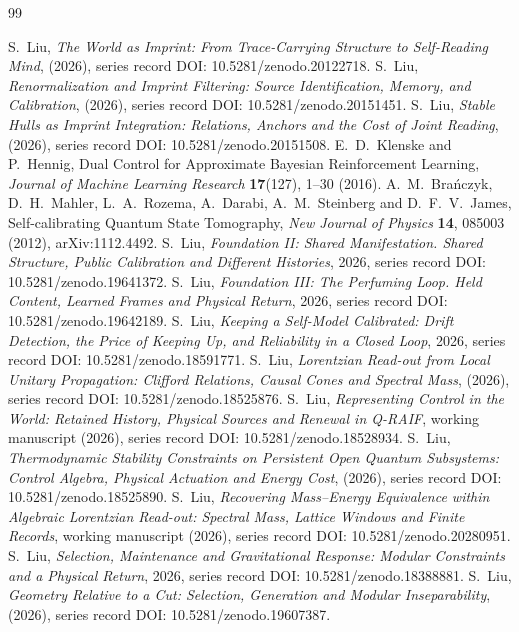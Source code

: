 \documentclass[11pt,a4paper]{article}
\begin{document}
\begin{thebibliography}{99}
\raggedright
{} S.~Liu, \emph{The World as Imprint: From Trace-Carrying Structure to Self-Reading Mind}, (2026), series record DOI: 10.5281/zenodo.20122718.
 S.~Liu, \emph{Renormalization and Imprint Filtering: Source Identification, Memory, and Calibration}, (2026), series record DOI: 10.5281/zenodo.20151451.
 S.~Liu, \emph{Stable Hulls as Imprint Integration: Relations, Anchors and the Cost of Joint Reading}, (2026), series record DOI: 10.5281/zenodo.20151508.
 E.~D.~Klenske and P.~Hennig, Dual Control for Approximate Bayesian Reinforcement Learning, \emph{Journal of Machine Learning Research} \textbf{17}(127), 1--30 (2016).
 A.~M.~Bra\'nczyk, D.~H.~Mahler, L.~A.~Rozema, A.~Darabi, A.~M.~Steinberg and D.~F.~V.~James, Self-calibrating Quantum State Tomography, \emph{New Journal of Physics} \textbf{14}, 085003 (2012), arXiv:1112.4492.
 S.~Liu, \emph{Foundation II: Shared Manifestation. Shared Structure, Public Calibration and Different Histories}, 2026, series record DOI: 10.5281/zenodo.19641372.
 S.~Liu, \emph{Foundation III: The Perfuming Loop. Held Content, Learned Frames and Physical Return}, 2026, series record DOI: 10.5281/zenodo.19642189.
 S.~Liu, \emph{Keeping a Self-Model Calibrated: Drift Detection, the Price of Keeping Up, and Reliability in a Closed Loop}, 2026, series record DOI: 10.5281/zenodo.18591771.
 S.~Liu, \emph{Lorentzian Read-out from Local Unitary Propagation: Clifford Relations, Causal Cones and Spectral Mass}, (2026), series record DOI: 10.5281/zenodo.18525876.
 S.~Liu, \emph{Representing Control in the World: Retained History, Physical Sources and Renewal in Q-RAIF}, working manuscript (2026), series record DOI: 10.5281/zenodo.18528934.
 S.~Liu, \emph{Thermodynamic Stability Constraints on Persistent Open Quantum Subsystems: Control Algebra, Physical Actuation and Energy Cost}, (2026), series record DOI: 10.5281/zenodo.18525890.
 S.~Liu, \emph{Recovering Mass--Energy Equivalence within Algebraic Lorentzian Read-out: Spectral Mass, Lattice Windows and Finite Records}, working manuscript (2026), series record DOI: 10.5281/zenodo.20280951.
 S.~Liu, \emph{Selection, Maintenance and Gravitational Response: Modular Constraints and a Physical Return}, 2026, series record DOI: 10.5281/zenodo.18388881.
 S.~Liu, \emph{Geometry Relative to a Cut: Selection, Generation and Modular Inseparability}, (2026), series record DOI: 10.5281/zenodo.19607387.

\end{thebibliography}
\end{document}
